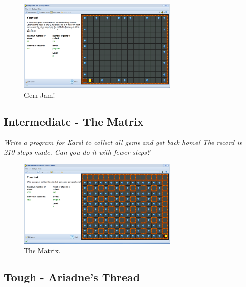 \documentclass[article,A4,12pt]{llncs}
\begin{document}
\begin{figure}[!ht]
\begin{center}
\includegraphics[width=0.7\textwidth]{img/game-gemjam.png}
\end{center}
\vspace{-4mm}
\caption{Gem Jam!}
\label{fig:gemjam}
\vspace{-10mm}
\end{figure}
\noindent

\newpage

\subsection{Intermediate - The Matrix}

{\em Write a program for Karel to collect all gems and get back home! The record is 
210 steps made. Can you do it with fewer steps?}

\begin{figure}[!ht]
\begin{center}
\includegraphics[width=0.7\textwidth]{img/game-matrix.png}
\end{center}
\vspace{-4mm}
\caption{The Matrix.}
\label{fig:matrix}
\vspace{-10mm}
\end{figure}
\noindent

\subsection{Tough - Ariadne's Thread}
\end{document}
